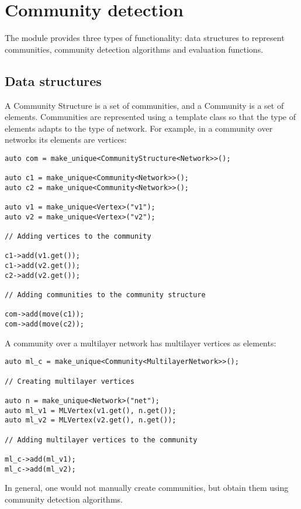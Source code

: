 \chapter{Community detection} \label{ch:comm}

The  module provides three types of functionality: data structures to represent communities, community detection algorithms and evaluation functions.

\section{Data structures}

A Community Structure is a set of communities, and a Community is a set of elements. Communities are represented using a template class so that the type of elements adapts to the type of network. For example, in a community over networks its elements are vertices:
\begin{lstlisting}[style=c++]
auto com = make_unique<CommunityStructure<Network>>();

auto c1 = make_unique<Community<Network>>();
auto c2 = make_unique<Community<Network>>();

auto v1 = make_unique<Vertex>("v1");
auto v2 = make_unique<Vertex>("v2");

// Adding vertices to the community

c1->add(v1.get());
c1->add(v2.get());
c2->add(v2.get());

// Adding communities to the community structure

com->add(move(c1));
com->add(move(c2));
\end{lstlisting}

A community over a multilayer network has multilayer vertices as elements:
\begin{lstlisting}[style=c++]
auto ml_c = make_unique<Community<MultilayerNetwork>>();

// Creating multilayer vertices

auto n = make_unique<Network>("net");
auto ml_v1 = MLVertex(v1.get(), n.get());
auto ml_v2 = MLVertex(v2.get(), n.get());

// Adding multilayer vertices to the community

ml_c->add(ml_v1);
ml_c->add(ml_v2);
\end{lstlisting}

In general, one would not manually create communities, but obtain them using community detection algorithms.


